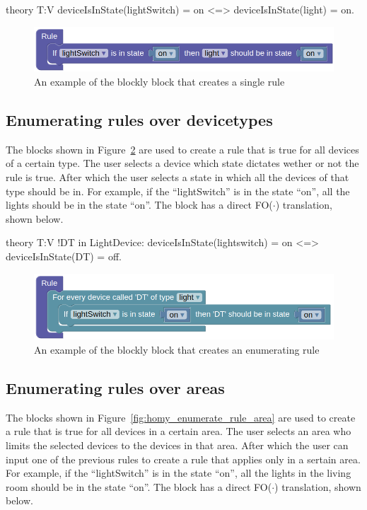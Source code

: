 \documentclass[11pt,a4paper]{report}
\newcommand{\fodot}{FO($\cdot$)\xspace}
\begin{document}
\begin{idplisting}
theory T:V {
    deviceIsInState(lightSwitch) = on <=> deviceIsInState(light) = on.
}
\end{idplisting}

\begin{figure}
    \centering
    \includegraphics[width=0.8\linewidth]{images/homy_single_rule.png}
    \caption{An example of the blockly block that creates a single rule}
    \label{fig:homy_single_rule}
\end{figure}

\subsection{Enumerating rules over devicetypes}
The blocks shown in Figure~\ref{fig:homy_enumerate_rule_devicetype} are used to create a rule that is true for all devices of a certain type. The user selects a device which state dictates wether or not the rule is true. After which the user selects a state in which all the devices of that type should be in. For example, if the ``lightSwitch'' is in the state ``on'', all the lights should be in the state ``on''. The block has a direct \fodot translation, shown below.

\begin{idplisting}
theory T:V {
    !DT in LightDevice: deviceIsInState(lightswitch) = on <=> deviceIsInState(DT) = off.
}
\end{idplisting}

\begin{figure}
    \centering
    \includegraphics[width=0.8\linewidth]{images/homy_enumerate_rule_devicetype.png}
    \caption{An example of the blockly block that creates an enumerating rule}
    \label{fig:homy_enumerate_rule_devicetype}
\end{figure}

\subsection{Enumerating rules over areas}
The blocks shown in Figure~\ref{fig:homy_enumerate_rule_area} are used to create a rule that is true for all devices in a certain area. The user selects an area who limits the selected devices to the devices in that area. After which the user can input one of the previous rules to create a rule that applies only in a sertain area. For example, if the ``lightSwitch'' is in the state ``on'', all the lights in the living room should be in the state ``on''. The block has a direct \fodot translation, shown below.
\end{document}
